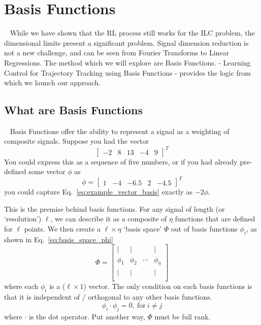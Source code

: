 
\FloatBarrier\section{Basis Functions}
~\label{sec:basis_functions}
While we have shown that the RL process still works for the ILC problem, the dimensional limits present a significant problem. Signal dimension reduction is not a new challenge, and can be seen from Fourier Transforms to Linear Regressions. The method which we will explore are Basis Functions. \cite{PhanFrueh1996} - Learning Control for Trajectory Tracking using Basis Functions - provides the logic from which we launch our approach. 

\FloatBarrier\subsection{What are Basis Functions}
~\label{sub:what_are_basis}
Basis Functions offer the ability to represent a signal as a weighting of composite signals. Suppose you had the vector
\begin{equation}
    \begin{bmatrix}
        -2 & 8 & 13 & -4 & 9
    \end{bmatrix}^T
    \label{eq:example_vector_basis}
\end{equation}
You could express this as a sequence of five numbers, or if you had already pre-defined some vector $\phi$ as
\begin{equation}
    \phi = 
    \begin{bmatrix}
        1 & -4 & -6.5 & 2 & -4.5
    \end{bmatrix}^T
\end{equation}
you could capture Eq.~\ref{eq:example_vector_basis} exactly as $-2\phi$. 

This is the premise behind basis functions. For any signal of length (or `resolution') $\ell$, we can describe it as a composite of $\eta$ functions that are defined for $\ell$ points. We then create a $\ell \times \eta$ `basis space' $\Phi$ out of basis functions $\phi_i$, as shown in Eq.~\ref{eq:basis_space_phi}
\begin{equation}
    \Phi = 
    \begin{bmatrix}
        | & | &  & | \\
        \phi_1 & \phi_2 & \cdots & \phi_{\eta} \\
        | & | &  & | \\
    \end{bmatrix}
    \label{eq:basis_space_phi}
\end{equation}
where each $\phi_i$ is a ($\ell \times 1$) vector. The only condition on each basis functions is that it is independent of / orthogonal to any other basis functions.
\begin{equation}
    \phi_i \cdot \phi_j = 0,\ \text{for}\ i \ne j
    \label{eq:orthogonal_basis}
\end{equation}
where $\cdot$ is the dot operator. Put another way, $\Phi$ must be full rank. 

